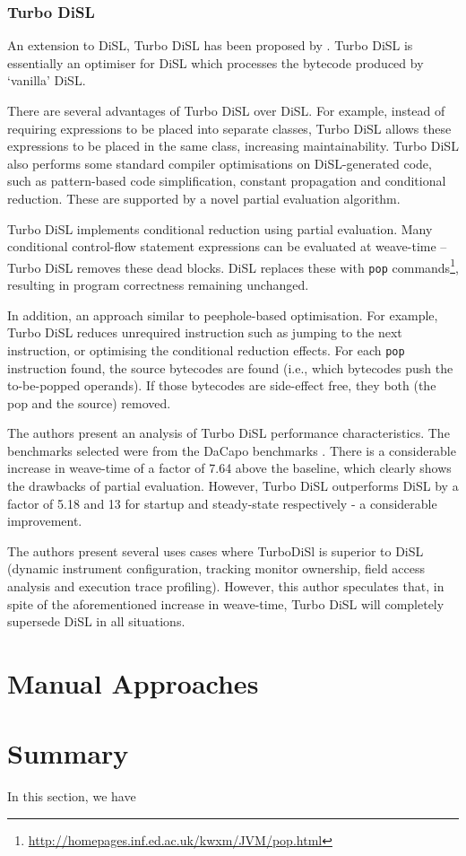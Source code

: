		\subsubsection{Turbo DiSL} \label{sec:instrumentation/hybrid/disl/turbo}
		An extension to DiSL, Turbo DiSL has been proposed by \citet[p.~353-368]{Furia2012}. Turbo DiSL is essentially an optimiser for DiSL which processes the bytecode produced by `vanilla' DiSL.
		
		There are several advantages of Turbo DiSL over DiSL. For example, instead of requiring expressions to be placed into separate classes, Turbo DiSL allows these expressions to be placed in the same class, increasing maintainability. Turbo DiSL also performs some standard compiler optimisations on DiSL-generated code, such as pattern-based code simplification, constant propagation and conditional reduction. These are supported by a novel partial evaluation algorithm.
		
		Turbo DiSL implements conditional reduction using partial evaluation. Many conditional control-flow statement expressions can be evaluated at weave-time -- Turbo DiSL removes these dead blocks. DiSL replaces these with \texttt{pop} commands\footnote{\url{http://homepages.inf.ed.ac.uk/kwxm/JVM/pop.html}}, resulting in program correctness remaining unchanged.
		
		In addition, an approach similar to peephole-based optimisation. For example, Turbo DiSL reduces unrequired instruction such as jumping to the next instruction, or optimising the conditional reduction effects. For each \texttt{pop} instruction found, the source bytecodes are found (i.e., which bytecodes push the to-be-popped operands). If those bytecodes are side-effect free, they both (the pop and the source) removed.
		
		The authors present an analysis of Turbo DiSL performance characteristics. The benchmarks selected were from the DaCapo benchmarks \citep{Blackburn2006}. There is a considerable increase in weave-time of a factor of 7.64 above the baseline, which clearly shows the drawbacks of partial evaluation. However, Turbo DiSL outperforms DiSL by a factor of 5.18 and 13 for startup and steady-state respectively - a considerable improvement.

		The authors present several uses cases where TurboDiSl is superior to DiSL (dynamic instrument configuration, tracking monitor ownership, field access analysis and execution trace profiling). However, this author speculates that, in spite of the aforementioned increase in weave-time, Turbo DiSL will completely supersede DiSL in all situations. 
		
\section{Manual Approaches} \label{sec:instrumentation/manual}	
	
\section{Summary} \label{sec:instrumentation/summary}
In this section, we have 
